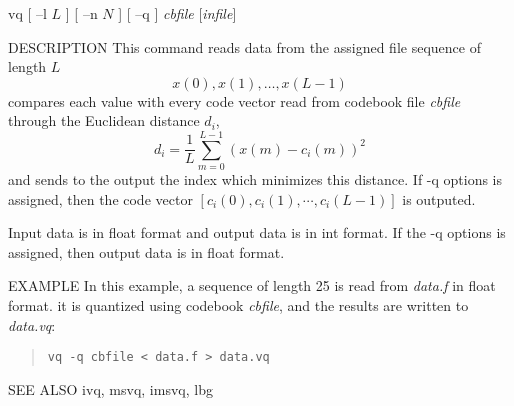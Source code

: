
\begin{synopsis}
\item [vq] [ --l $L$ ] [ --n $N$ ] [ --q ] {\em cbfile} [{\em infile}]
\end{synopsis}

\begin{qsection}{DESCRIPTION}
This command reads data from the assigned file sequence of length $L$
\begin{displaymath}
  x(0),x(1),\ldots,x(L-1)
\end{displaymath}
compares each value with every code vector read from
codebook file {\em cbfile} through the Euclidean distance $d_i$,
\begin{displaymath}
d_i = \frac{1}{L}\sum_{m=0}^{L-1} (x(m)-c_i(m))^2
\end{displaymath}
and sends to the output the index which minimizes this distance.
If -q options is assigned, then the code vector
$[c_i(0), c_i(1), \cdots, c_i(L-1)]$ is outputed.
\par
Input data is in float format and output data is in int format.
If the -q options is assigned, then output data is in float format.
\end{qsection}

\begin{options}
\end{options}

\begin{qsection}{EXAMPLE}
In this example, a sequence of length 25 is read from {\em data.f}
in float format.
it is quantized using codebook {\em cbfile},
and the results are written to {\em data.vq}:
\begin{quote}
 \verb!vq -q cbfile < data.f > data.vq!
\end{quote} 
\end{qsection}

\begin{qsection}{SEE ALSO}
ivq, msvq, imsvq, lbg
\end{qsection}
